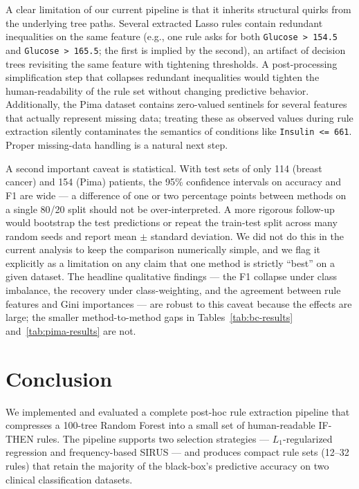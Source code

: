 \documentclass[11pt]{article}
\begin{document}
A clear limitation of our current pipeline is that it inherits structural quirks from the underlying tree paths. Several extracted Lasso rules contain redundant inequalities on the same feature (e.g., one rule asks for both \texttt{Glucose > 154.5} and \texttt{Glucose > 165.5}; the first is implied by the second), an artifact of decision trees revisiting the same feature with tightening thresholds. A post-processing simplification step that collapses redundant inequalities would tighten the human-readability of the rule set without changing predictive behavior. Additionally, the Pima dataset contains zero-valued sentinels for several features that actually represent missing data; treating these as observed values during rule extraction silently contaminates the semantics of conditions like \texttt{Insulin <= 661}. Proper missing-data handling is a natural next step.

A second important caveat is statistical. With test sets of only 114 (breast cancer) and 154 (Pima) patients, the 95\% confidence intervals on accuracy and F1 are wide --- a difference of one or two percentage points between methods on a single 80/20 split should not be over-interpreted. A more rigorous follow-up would bootstrap the test predictions or repeat the train-test split across many random seeds and report mean $\pm$ standard deviation. We did not do this in the current analysis to keep the comparison numerically simple, and we flag it explicitly as a limitation on any claim that one method is strictly ``best'' on a given dataset. The headline qualitative findings --- the F1 collapse under class imbalance, the recovery under class-weighting, and the agreement between rule features and Gini importances --- are robust to this caveat because the effects are large; the smaller method-to-method gaps in Tables~\ref{tab:bc-results} and~\ref{tab:pima-results} are not.

\section{Conclusion}

We implemented and evaluated a complete post-hoc rule extraction pipeline that compresses a 100-tree Random Forest into a small set of human-readable IF-THEN rules. The pipeline supports two selection strategies --- $L_1$-regularized regression and frequency-based SIRUS --- and produces compact rule sets (12--32 rules) that retain the majority of the black-box's predictive accuracy on two clinical classification datasets.
\end{document}
